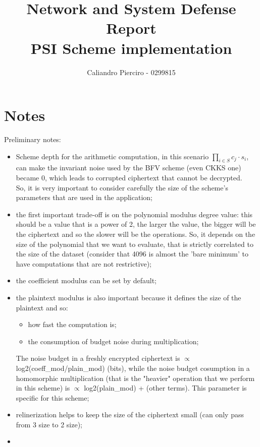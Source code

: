 \documentclass[12pt]{extarticle}
\title{Network and System Defense Report\\PSI Scheme implementation}
\author{Caliandro Pierciro - 0299815}
\begin{document}
\maketitle

\section{Notes}
Preliminary notes:
\begin{itemize}
	\item Scheme depth for the arithmetic computation, in this scenario $\prod\limits_{i \in S} c_j \cdot s_i$, can make the invariant noise used by the BFV scheme (even CKKS one) became 0, which leads to corrupted ciphertext that cannot be decrypted.\\So, it is very important to consider carefully the size of the scheme's parameters that are used in the application;
	\item the first important trade-off is on the polynomial modulus degree value: this should be a value that is a power of 2, the larger the value, the bigger will be the ciphertext and so the slower will be the operations. So, it depends on the size of the polynomial that we want to evaluate, that is strictly correlated to the size of the dataset (consider that 4096 is almost the 'bare minimum' to have computations that are not restrictive);
	\item the coefficient modulus can be set by default;
	\item the plaintext modulus is also important because it defines the size of the plaintext and so: 
		\begin{itemize}
			\item how fast the computation is;
			\item the consumption of budget noise during multiplication;
		\end{itemize}
		The noise budget in a freshly encrypted ciphertext is $\propto$ log2(coeff\_mod/plain\_mod) (bits), while the noise budget cosumption in a homomorphic multiplication (that is the "heavier" operation that we perform in this scheme) is $\propto$ log2(plain\_mod) + (other terms). This parameter is specific for this scheme;
	\item relinerization helps to keep the size of the ciphertext small (can only pass from 3 size to 2 size);
	\item 
\end{itemize}
\end{document}

